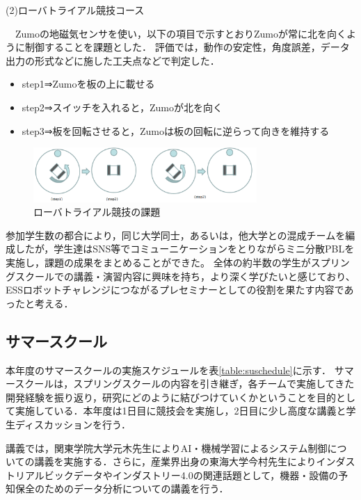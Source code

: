 \documentclass[submit]{ipsj}
\begin{document}
\begin{description}
\item[(2)ローバトライアル競技コース]
\end{description}
　Zumoの地磁気センサを使い，以下の項目で示すとおりZumoが常に北を向くように制御することを課題とした．
評価では，動作の安定性，角度誤差，データ出力の形式などに施した工夫点などで判定した．
\begin{itemize}
\item step1⇒Zumoを板の上に載せる
\item step2⇒スイッチを入れると，Zumoが北を向く
\item step3⇒板を回転させると，Zumoは板の回転に逆らって向きを維持する
\end{itemize}
\begin{figure}[h]
\centering
\includegraphics[width=8.5cm]{images/zumo.png}
\caption{ローバトライアル競技の課題} \label{fig:zumokadai}
\end{figure}

参加学生数の都合により，同じ大学同士，あるいは，他大学との混成チームを編成したが，学生達はSNS等でコミューニケーションをとりながらミニ分散PBLを実施し，課題の成果をまとめることができた。
全体の約半数の学生がスプリングスクールでの講義・演習内容に興味を持ち，より深く学びたいと感じており、ESSロボットチャレンジにつながるプレセミナーとしての役割を果たす内容であったと考える．

\subsection{サマースクール}

本年度のサマースクールの実施スケジュールを表\ref{table:suschedule}に示す．
サマースクールは，スプリングスクールの内容を引き継ぎ，各チームで実施してきた開発経験を振り返り，研究にどのように結びつけていくかということを目的として実施している．本年度は1日目に競技会を実施し，2日目に少し高度な講義と学生ディスカッションを行う．

講義では，関東学院大学元木先生によりAI・機械学習によるシステム制御についての講義を実施する．さらに，産業界出身の東海大学今村先生によりインダストリアルビックデータやインダストリー4.0の関連話題として，機器・設備の予知保全のためのデータ分析についての講義を行う．
\end{document}
